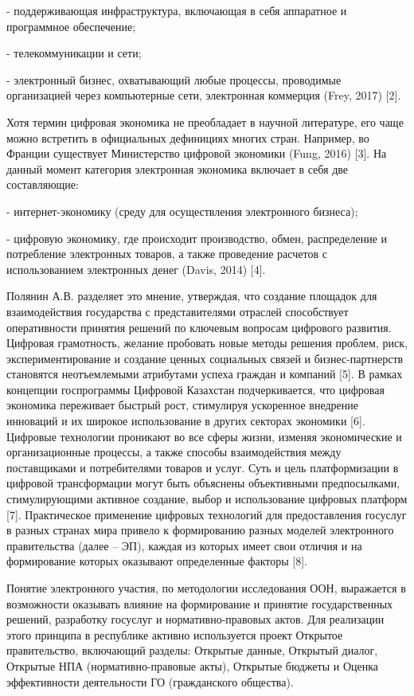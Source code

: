 {- поддерживающая инфраструктура, включающая в себя аппаратное и
программное обеспечение;

- телекоммуникации и сети;

- электронный бизнес, охватывающий любые процессы, проводимые
организацией через компьютерные сети, электронная коммерция (Frey, 2017)
{[}2{]}.

Хотя термин цифровая экономика не преобладает в научной литературе, его
чаще можно встретить в официальных дефинициях многих стран. Например, во
Франции существует Министерство цифровой экономики (Fung, 2016) {[}3{]}.
На данный момент категория электронная экономика включает в себя две
составляющие:

- интернет-экономику (среду для осуществления электронного бизнеса);

- цифровую экономику, где происходит производство, обмен, распределение
и потребление электронных товаров, а также проведение расчетов с
использованием электронных денег (Davis, 2014) {[}4{]}.

Полянин А.В. разделяет это мнение, утверждая, что создание площадок для
взаимодействия государства с представителями отраслей способствует
оперативности принятия решений по ключевым вопросам цифрового развития.
Цифровая грамотность, желание пробовать новые методы решения проблем,
риск, экспериментирование и создание ценных социальных связей и
бизнес-партнерств становятся неотъемлемыми атрибутами успеха граждан и
компаний {[}5{]}. В рамках концепции госпрограммы Цифровой Казахстан
подчеркивается, что цифровая экономика переживает быстрый рост,
стимулируя ускоренное внедрение инноваций и их широкое использование в
других секторах экономики {[}6{]}. Цифровые технологии проникают во все
сферы жизни, изменяя экономические и организационные процессы, а также
способы взаимодействия между поставщиками и потребителями товаров и
услуг. Суть и цель платформизации в цифровой трансформации могут быть
объяснены объективными предпосылками, стимулирующими активное создание,
выбор и использование цифровых платформ {[}7{]}. Практическое применение
цифровых технологий для предоставления госуслуг в разных странах мира
привело к формированию разных моделей электронного правительства (далее
-- ЭП), каждая из которых имеет свои отличия и на формирование которых
оказывают определенные факторы {[}8{]}.

Понятие электронного участия, по методологии исследования ООН,
выражается в возможности оказывать влияние на формирование и принятие
государственных решений, разработку госуслуг и нормативно-правовых
актов. Для реализации этого принципа в республике активно используется
проект Открытое правительство, включающий разделы: Открытые данные,
Открытый диалог, Открытые НПА (нормативно-правовые акты), Открытые
бюджеты и Оценка эффективности деятельности ГО (гражданского общества).

}
